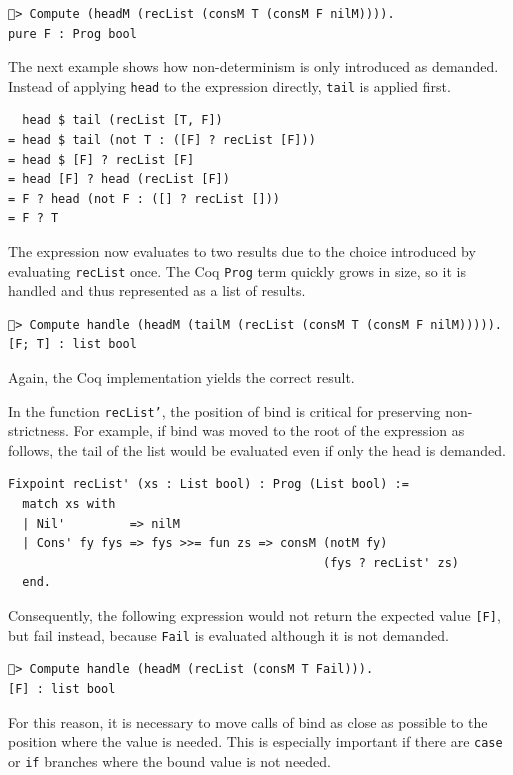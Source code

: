 \documentclass[a4paper, 11pt, fleqn, twoside, abstract=on]{scrreprt}
\newcommand{\hinl}[1]{\texttt{#1}}
\newcommand{\cinl}[1]{\texttt{#1}}
\begin{document}
\begin{verbatim}
🐔> Compute (headM (recList (consM T (consM F nilM)))).
pure F : Prog bool
\end{verbatim}

The next example shows how non-determinism is only introduced as demanded.
Instead of applying \hinl{head} to the expression directly, \hinl{tail} is applied first.

\begin{verbatim}
  head $ tail (recList [T, F])
= head $ tail (not T : ([F] ? recList [F]))
= head $ [F] ? recList [F]
= head [F] ? head (recList [F])
= F ? head (not F : ([] ? recList []))
= F ? T
\end{verbatim}
\noindent
The expression now evaluates to two results due to the choice introduced by evaluating \hinl{recList} once.
The Coq \cinl{Prog} term quickly grows in size, so it is handled and thus represented as a list of results.

\begin{verbatim}
🐔> Compute handle (headM (tailM (recList (consM T (consM F nilM))))).
[F; T] : list bool
\end{verbatim}
\noindent
Again, the Coq implementation yields the correct result.

In the function \cinl{recList'}, the position of bind is critical for preserving non-strictness.
For example, if bind was moved to the root of the expression as follows, the tail of the list would be evaluated even if only the head is demanded.

\begin{verbatim}
Fixpoint recList' (xs : List bool) : Prog (List bool) :=
  match xs with
  | Nil'         => nilM
  | Cons' fy fys => fys >>= fun zs => consM (notM fy)
                                            (fys ? recList' zs)
  end.
\end{verbatim}
\noindent
Consequently, the following expression would not return the expected value \cinl{[F]}, but fail instead, because \cinl{Fail} is evaluated although it is not demanded.

\begin{verbatim}
🐔> Compute handle (headM (recList (consM T Fail))).
[F] : list bool
\end{verbatim}
\noindent
For this reason, it is necessary to move calls of bind as close as possible to the position where the value is needed.
This is especially important if there are \cinl{case} or \cinl{if} branches where the bound value is not needed.
\end{document}
